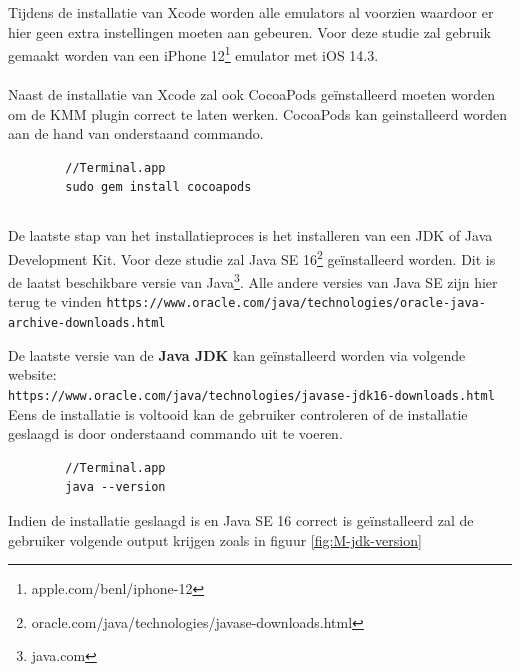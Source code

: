     Tijdens de installatie van Xcode worden alle emulators al voorzien waardoor er hier geen extra instellingen moeten aan gebeuren. Voor deze studie zal gebruik gemaakt worden van een iPhone 12\footnote{apple.com/benl/iphone-12} emulator met iOS 14.3.
    \\ \\
    Naast de installatie van Xcode zal ook CocoaPods geïnstalleerd moeten worden om de KMM plugin correct te laten werken. CocoaPods kan geinstalleerd worden aan de hand van onderstaand commando.
    
    \begin{lstlisting}
        //Terminal.app
        sudo gem install cocoapods
    \end{lstlisting}
    
    \subsection{}
    \label{sec:I-JDK}
    De laatste stap van het installatieproces is het installeren van een JDK of Java Development Kit. Voor deze studie zal Java SE 16\footnote{oracle.com/java/technologies/javase-downloads.html} geïnstalleerd worden. Dit is de laatst beschikbare versie van Java\footnote{java.com}. Alle andere versies van Java SE zijn hier terug te vinden \verb*|https://www.oracle.com/java/technologies/oracle-java-archive-downloads.html|
    
    De laatste versie van de \textbf{Java JDK} kan geïnstalleerd worden via volgende website: \\
    \verb*|https://www.oracle.com/java/technologies/javase-jdk16-downloads.html|
    \\
    
    Eens de installatie is voltooid kan de gebruiker controleren of de installatie geslaagd is door onderstaand commando uit te voeren.
    \begin{lstlisting}
        //Terminal.app
        java --version
    \end{lstlisting}
    Indien de installatie geslaagd is en Java SE 16 correct is geïnstalleerd zal de gebruiker volgende output krijgen zoals in figuur \ref{fig:M-jdk-version} 
    
